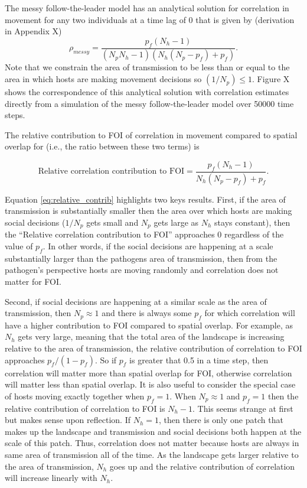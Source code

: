 ﻿\documentclass[11pt]{article}
\begin{document}
The messy follow-the-leader model has an analytical solution for correlation in movement for any two individuals at a time lag of 0 that is given by (derivation in Appendix X)
\begin{equation}
    \rho_{messy} = \frac{p_f(N_h - 1)}{(N_p N_h - 1)(N_h(N_p - p_f) + p_f)}.
    \label{eq:messy_leader}
\end{equation}
Note that we constrain the area of transmission to be less than or equal to the area in which hosts are making movement decisions so $(1 / N_p) \leq 1$. Figure X shows the correspondence of this analytical solution with correlation estimates directly from a simulation of the messy follow-the-leader model over 50000 time steps.

The relative contribution to FOI of correlation in movement compared to spatial overlap for (i.e., the ratio between these two terms) is

\begin{equation}
    \text{Relative correlation contribution to FOI} = \frac{p_f(N_h - 1)}{N_h(N_p - p_f) + p_f}.
    \label{eq:relative_contrib}
\end{equation}

Equation \ref{eq:relative_contrib} highlights two keys results.  First, if the area of transmission is substantially smaller then the area over which hosts are making social decisions ($1 / N_p$ gets small and $N_p$ gets large as $N_h$ stays constant), then the ``Relative correlation contribution to FOI'' approaches 0 regardless of the value of $p_f$. In other words, if the social decisions are happening at a scale substantially larger than the pathogens area of transmission, then from the pathogen's perspective hosts are moving randomly and correlation does not matter for FOI.

Second, if social decisions are happening at a similar scale as the area of transmission, then $N_p \approx 1$ and there is always some $p_f$ for which correlation will have a higher contribution to FOI compared to spatial overlap.  For example, as $N_h$ gets very large, meaning that the total area of the landscape is increasing relative to the area of transmission, the relative contribution of correlation to FOI approaches $p_f / (1 - p_f)$. So if $p_f$ is greater that 0.5 in a time step, then correlation will matter more than spatial overlap for FOI, otherwise correlation will matter less than spatial overlap.  It is also useful to consider the special case of hosts moving exactly together when $p_f = 1$.  When $N_p \approx 1$ and $p_f = 1$ then the relative contribution of correlation to FOI is $N_h - 1$.  This seems strange at first but makes sense upon reflection.  If $N_h = 1$, then there is only one patch that makes up the landscape and transmission and social decisions both happen at the scale of this patch. Thus, correlation does not matter because hosts are always in same area of transmission all of the time.  As the landscape gets larger relative to the area of transmission, $N_h$ goes up and the relative contribution of correlation will increase linearly with $N_h$.  
\end{document}
